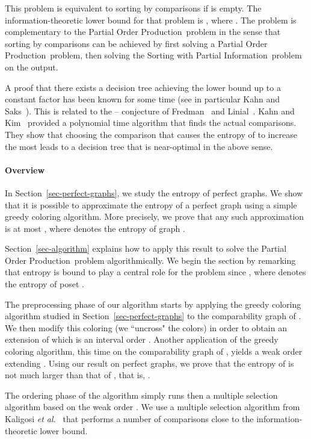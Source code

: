 \documentclass[12pt,oneside]{article}
\newcommand{\partsort}{{\sc Partial Order Production}}
\newcommand{\sortwpi}{{\sc Sorting with Partial Information}}
\begin{document}
This problem is equivalent to sorting by comparisons if  is empty. The information-theoretic lower bound for that problem is , where . The problem is complementary to the \partsort\ problem in the sense that sorting by comparisons can be achieved by first solving a \partsort\ problem, then solving the \sortwpi\ problem on the output.

A proof that there exists a decision tree achieving the lower bound up to a constant factor has been known for some time (see in particular Kahn and Saks~\cite{KS84j}). This is related to the -- conjecture of Fredman~\cite{F76} and Linial~\cite{L84}. Kahn and Kim~\cite{KK95} provided a polynomial time algorithm that finds the actual comparisons. They show that choosing the comparison that causes the entropy of  to increase the most leads to a decision tree that is near-optimal in the above sense.

\paragraph{Overview}
In Section~\ref{sec-perfect-graphs}, we study the entropy of perfect graphs. We show that it is possible to approximate the entropy of a perfect graph  using a simple greedy coloring algorithm. More precisely, we prove that any such approximation is at most , where  denotes the entropy of graph .\smallskip

Section~\ref{sec-algorithm} explains how to apply this result to solve the \partsort\ problem algorithmically. We begin the section by remarking that entropy is bound to play a central role for the problem since , where  denotes the entropy of poset .

The preprocessing phase of our algorithm starts by applying the greedy coloring algorithm studied in Section~\ref{sec-perfect-graphs} to the comparability graph of .  We then modify this coloring (we ``uncross" the colors) in order to obtain an extension of  which is an interval order . Another application of the greedy coloring algorithm, this time on the comparability graph of , yields a weak order  extending . Using our result on perfect graphs, we prove that the entropy of  is not much larger than that of , that is, .

The ordering phase of the algorithm simply runs then a multiple selection algorithm based on the weak order . We use a multiple selection algorithm from Kaligosi {\it et al.}~\cite{KMMS05} that performs a number of comparisons close to the information-theoretic lower bound.
\end{document}
